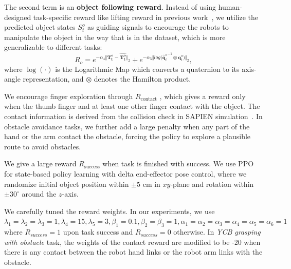 \documentclass[letterpaper]{article}
\begin{document}
The second term is an \textbf{object following reward}. Instead of using human-designed task-specific reward like lifting reward in previous work~\cite{chen2024vividex, shi2025learning}, we utilize the predicted object states $S_{t}^o$ as guiding signals to encourage the robots to manipulate the object in the way that is in the dataset, which is more generalizable to different tasks:
\begin{equation*}
    R_{o} = e^{-\alpha_{4}\Vert \mathbf{T_{t}^o-\hat{\mathbf{T_{t}^o}}} \Vert_{2}}+e^{-\alpha_{5}\Vert {log(\hat{\mathbf{q}}_{t}^{o}}^{-1}\otimes \mathbf{q}_{t}^{o}) \Vert_{2}},
\end{equation*}
where $\log(\cdot)$ is the Logarithmic Map which converts a quaternion to its axis-angle representation, and $\otimes$ denotes the Hamilton product.

We encourage finger exploration through $R_{\text{contact}}$
, which gives a reward only when the thumb finger and at least one other finger contact with the object. The contact information is derived from the collision check in SAPIEN simulation~\cite{xiang2020sapien}. In obstacle avoidance tasks, we further add a large penalty when any part of the hand or the arm contact the obstacle, forcing the policy to explore a plausible route to avoid obstacles.

We give a large reward $R_{\text{success}}$ when task is finished with success.
We use PPO~\cite{schulman2017proximal} for state-based policy learning with delta end-effector pose control, where we randomize initial object position within $\pm 5$ cm in $xy$-plane and rotation within $\pm 30^\circ$ around the $z$-axis.

We carefully tuned the reward weights. In our experiments, we use
$\lambda_1=\lambda_2=\lambda_3=1,\lambda_4 =15,\lambda_5=3, \beta_1=0.1, \beta_2=\beta_3=1,\alpha_1=\alpha_2=\alpha_3=\alpha_4=\alpha_5=\alpha_6=1$ where $R_{success}=1$ upon task success and $R_{success}=0$ otherwise. In \textit{YCB grasping with obstacle} task, the weights of the contact reward are modified to be -20 when there is any contact between the robot hand links or the robot arm links with the obstacle.
\end{document}
